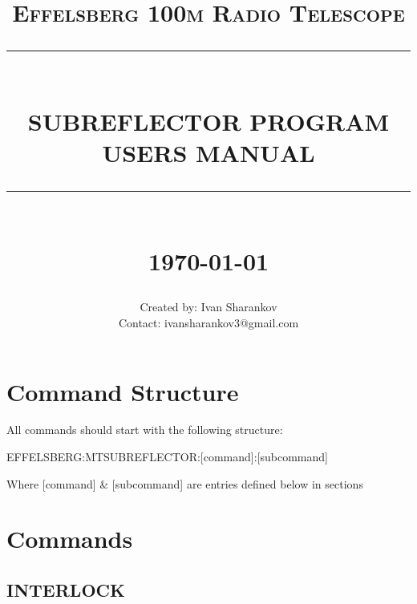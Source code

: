 \documentclass[12pt]{report}
\newcommand{\HRule}[1]{\rule{\linewidth}{#1}}
\begin{document}
\title{ \normalsize \textsc{Effelsberg 100m Radio Telescope}
		\\ [2.0cm]
		\HRule{0.5pt} \\
		\LARGE \textbf{\uppercase{Subreflector Program \\Users Manual}}
		\HRule{2pt} \\ [0.5cm]
		\normalsize \today \vspace*{5\baselineskip}}

\date{}

\author{
		Created by: Ivan Sharankov \\ 
		Contact: ivansharankov3@gmail.com \\
		}

\maketitle
\tableofcontents
\newpage

\sectionfont{\scshape}


\newpage
\section*{Command Structure}


All commands should start with the following structure:

\begin{center}
EFFELSBERG:MTSUBREFLECTOR:[command]:[subcommand]
\end{center} 

Where [command] \& [subcommand] are entries defined below in sections

\newpage
\section*{Commands}
\subsection*{INTERLOCK}
\end{document}
